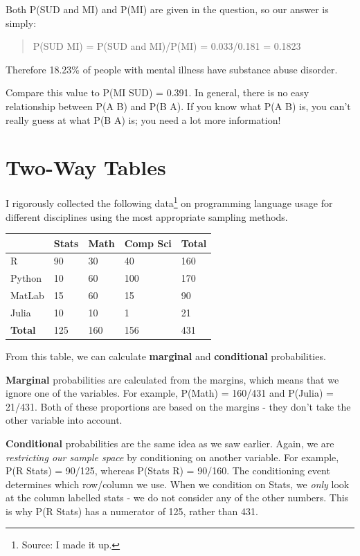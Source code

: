 \documentclass[
  letterpaper,
  DIV=11,
  numbers=noendperiod,
  oneside]{scrreprt}
\begin{document}
Both P(SUD and MI) and P(MI) are given in the question, so our answer is
simply:

\begin{quote}
P(SUD \textbar{} MI) = P(SUD and MI)/P(MI) = 0.033/0.181 = 0.1823
\end{quote}

Therefore 18.23\% of people with mental illness have substance abuse
disorder.

Compare this value to P(MI \textbar{} SUD) = 0.391. In general, there is
no easy relationship between P(A \textbar{} B) and P(B \textbar{} A). If
you know what P(A \textbar{} B) is, you can't really guess at what P(B
\textbar{} A) is; you need a lot more information!

\hypertarget{two-way-tables}{%
\section{Two-Way Tables}\label{two-way-tables}}

I rigorously collected the following data\footnote{Source: I made it up.}
on programming language usage for different disciplines using the most
appropriate sampling methods.

\begin{longtable}[]{@{}lllll@{}}
\toprule\noalign{}
& Stats & Math & Comp Sci & Total \\
\midrule\noalign{}
\endhead
\bottomrule\noalign{}
\endlastfoot
R & 90 & 30 & 40 & 160 \\
Python & 10 & 60 & 100 & 170 \\
MatLab & 15 & 60 & 15 & 90 \\
Julia & 10 & 10 & 1 & 21 \\
\textbf{Total} & 125 & 160 & 156 & 431 \\
\end{longtable}

From this table, we can calculate \textbf{marginal} and
\textbf{conditional} probabilities.

\textbf{Marginal} probabilities are calculated from the margins, which
means that we ignore one of the variables. For example, P(Math) =
160/431 and P(Julia) = 21/431. Both of these proportions are based on
the margins - they don't take the other variable into account.

\textbf{Conditional} probabilities are the same idea as we saw earlier.
Again, we are \emph{restricting our sample space} by conditioning on
another variable. For example, P(R \textbar{} Stats) = 90/125, whereas
P(Stats \textbar{} R) = 90/160. The conditioning event determines which
row/column we use. When we condition on Stats, we \emph{only} look at
the column labelled stats - we do not consider any of the other numbers.
This is why P(R \textbar{} Stats) has a numerator of 125, rather than
431.
\end{document}

